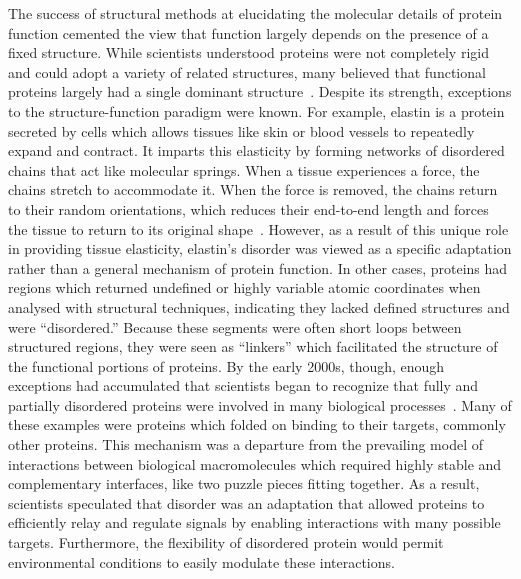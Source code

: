 The success of structural methods at elucidating the molecular details of protein function cemented the view that function largely depends on the presence of a fixed structure. While scientists understood proteins were not completely rigid and could adopt a variety of related structures, many believed that functional proteins largely had a single dominant structure~\cite{Karush1950}. Despite its strength, exceptions to the structure-function paradigm were known. For example, elastin is a protein secreted by cells which allows tissues like skin or blood vessels to repeatedly expand and contract. It imparts this elasticity by forming networks of disordered chains that act like molecular springs. When a tissue experiences a force, the chains stretch to accommodate it. When the force is removed, the chains return to their random orientations, which reduces their end-to-end length and forces the tissue to return to its original shape~\cite{Vrhovski1998, Alberts2014}. However, as a result of this unique role in providing tissue elasticity, elastin's disorder was viewed as a specific adaptation rather than a general mechanism of protein function. In other cases, proteins had regions which returned undefined or highly variable atomic coordinates when analysed with structural techniques, indicating they lacked defined structures and were ``disordered.'' Because these segments were often short loops between structured regions, they were seen as ``linkers'' which facilitated the structure of the functional portions of proteins. By the early 2000s, though, enough exceptions had accumulated that scientists began to recognize that fully and partially disordered proteins were involved in many biological processes~\cite{Plaxco1997, Wright1999, Dunker2001}. Many of these examples were proteins which folded on binding to their targets, commonly other proteins. This mechanism was a departure from the prevailing model of interactions between biological macromolecules which required highly stable and complementary interfaces, like two puzzle pieces fitting together. As a result, scientists speculated that disorder was an adaptation that allowed proteins to efficiently relay and regulate signals by enabling interactions with many possible targets. Furthermore, the flexibility of disordered protein would permit environmental conditions to easily modulate these interactions.

